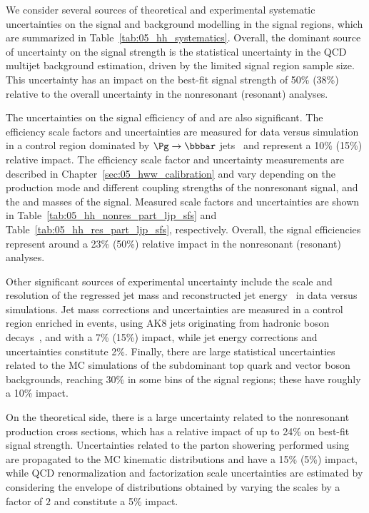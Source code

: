 We consider several sources of theoretical and experimental systematic uncertainties on the signal and background modelling in the signal regions, which are summarized in Table~\ref{tab:05_hh_systematics}.
Overall, the dominant source of uncertainty on the \HH signal strength is the statistical uncertainty in the QCD multijet background estimation, driven by the limited signal region sample size.
This uncertainty has an impact on the best-fit signal strength of 50\% (38\%) relative to the overall uncertainty in the nonresonant (resonant) analyses.

The uncertainties on the signal efficiency of \hbb and \hvv are also significant.
The \hbb efficiency scale factors and uncertainties are measured for data versus simulation in a control region dominated by $\Pg\to\bbbar$ jets~\cite{CMS:2023tlv} and represent a 10\% (15\%) relative impact.
The \hyvv efficiency scale factor and uncertainty measurements are described in Chapter~\ref{sec:05_hww_calibration} and vary depending on the production mode and different coupling strengths of the nonresonant \HH signal, and the \PX and \PY masses of the \XHY signal.
Measured scale factors and uncertainties are shown in Table~\ref{tab:05_hh_nonres_part_ljp_sfs} and Table~\ref{tab:05_hh_res_part_ljp_sfs}, respectively.
Overall, the \hyvv signal efficiencies represent around a 23\% (50\%) relative impact in the nonresonant (resonant) analyses.

Other significant sources of experimental uncertainty include the scale and resolution of the regressed jet mass and reconstructed jet energy~\cite{CMS-DP-2021-033} in data versus simulations.
Jet mass corrections and uncertainties are measured in a control region enriched in \ttbar events, using AK8 jets originating from hadronic \PW boson decays~\cite{CMS-PAS-B2G-21-001}, and with a 7\% (15\%) impact, while jet energy corrections and uncertainties constitute 2\%.
Finally, there are large statistical uncertainties related to the MC simulations of the subdominant top quark and vector boson backgrounds, reaching $30\%$ in some bins of the signal regions; these have roughly a 10\% impact.

On the theoretical side, there is a large uncertainty related to the nonresonant \HH production cross sections, which has a relative impact of up to 24\% on best-fit signal strength.
Uncertainties related to the parton showering performed using ~\cite{Mrenna:2016sih} are propagated to the MC kinematic distributions and have a 15\% (5\%) impact, while QCD renormalization and factorization scale uncertainties are estimated by considering the envelope of distributions obtained by varying the scales by a factor of $2$ and constitute a 5\% impact.

